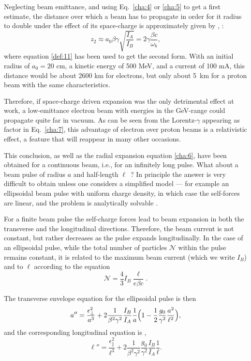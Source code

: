 \documentclass [12pt,a4paper,     ]{report} %
\begin{document}
   Neglecting beam emittance, and using Eq.~\eqref{cha:4} or \eqref{cha:5} to get a first estimate, the distance over which a beam has to propagate in order for it radius to double under the effect of its space-charge is approximately given by \cite{LAWSO1958-},  \cite[p.136]{LAWSO1977-}:
%
\begin{equation}\label{cha:7} %
         z_2 \approx a_0 \beta\gamma \sqrt{\frac{I_A}{I_B}}
         = 2 \gamma \frac{\beta c}{\omega_b},
\end{equation}
%
where equation \eqref{def:11} has been used to get the second form.  With an initial radius of $a_0 = 20$ cm, a kinetic energy of 500 MeV, and a current of 100 mA, this distance would be about 2600 km for electrons, but only about 5~km for a proton beam with the same characteristics.

  Therefore, if space-charge driven expansion was the only detrimental effect at work, a low-emittance electron beam with energies in the GeV-range could propagate quite far in vacuum.  As can be seen from the Lorentz-$\gamma$ appearing as factor in Eq.~\eqref{cha:7}, this advantage of electron over proton  beams is a relativistic effect, a feature that will reappear in many other occasions.

   This conclusion, as well as the radial expansion equation \eqref{cha:6}, have been obtained for a continuous beam, i.e., for an infinitely long pulse.  What about a beam pulse of radius $a$ and half-length $\ell$~?  In principle the answer is very difficult to obtain unless one considers a simplified model --- for example an ellipsoidal beam pulse with uniform charge density, in which case the self-forces are linear, and the problem is analytically solvable \cite[Sec.5.4.11]{REISE1994-}.

  For a finite beam pulse the self-charge forces lead to beam expansion in both the transverse and the longitudinal directions.  Therefore, the beam current is not constant, but rather decreases as the pulse expands longitudinally.  In the case of an ellipsoidal pulse, while the total number of particles $\mathcal{N}$ within the pulse remains constant, it is related to the maximum beam current (which we write $I_B$) and to $\ell$ according to the equation
%
\begin{equation}\label{cha:8} %
      \mathcal{N} = \frac{4}{3} I_B \frac{\ell}{e \beta c} .
\end{equation}
%

   The transverse envelope equation for the ellipsoidal pulse is then \cite[p.449]{REISE1994-}
%
\begin{equation}\label{cha:9} %
 a'' = \frac{\epsilon_{\perp}^2}{a^3}
        + 2\frac{1}{\beta^2\gamma^2} \frac{I_B}{I_A} \frac{1}{a}
          \Bigl(1 - \frac{1}{2} \frac{g_0}{\gamma^2} \frac{a^2}{\ell^2} \Bigr),
\end{equation}
%
and the corresponding longitudinal equation is \cite{KHOE-1977-}, \cite[p.449]{REISE1994-}
%
\begin{equation}\label{cha:10} %
 \ell'' = \frac{\epsilon_{\|}^2}{\ell^3}
       + 2\frac{1}{\beta^2\gamma^2} \frac{g_0}{\gamma^2}\frac{I_B}{I_A} \frac{1}{\ell}.
\end{equation}
%
\end{document}
